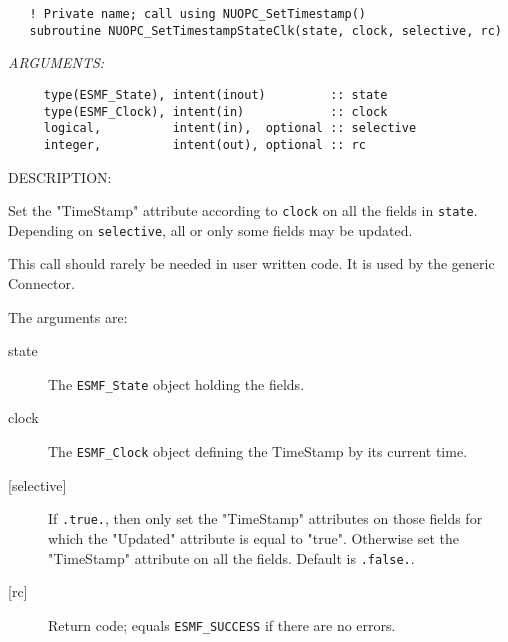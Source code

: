 \begin{verbatim}   ! Private name; call using NUOPC_SetTimestamp()
   subroutine NUOPC_SetTimestampStateClk(state, clock, selective, rc)\end{verbatim}{\em ARGUMENTS:}
\begin{verbatim}     type(ESMF_State), intent(inout)         :: state
     type(ESMF_Clock), intent(in)            :: clock
     logical,          intent(in),  optional :: selective
     integer,          intent(out), optional :: rc\end{verbatim}
{\sf DESCRIPTION:\\ }


     Set the "TimeStamp" attribute according to {\tt clock} on all the fields in
     {\tt state}. Depending on {\tt selective}, all or only some fields may be
     updated.
  
     This call should rarely be needed in user written code. It is used 
     by the generic Connector.
  
     The arguments are:
     \begin{description}
     \item[state]
       The {\tt ESMF\_State} object holding the fields.
     \item[clock]
       The {\tt ESMF\_Clock} object defining the TimeStamp by its current time.
     \item[{[selective]}]
       If {\tt .true.}, then only set the "TimeStamp" attributes on those fields
       for which the "Updated" attribute is equal to "true". Otherwise set the
       "TimeStamp" attribute on all the fields. Default is {\tt .false.}.
     \item[{[rc]}]
       Return code; equals {\tt ESMF\_SUCCESS} if there are no errors.
     \end{description}
  
\setlength{\parskip}{\oldparskip}
\setlength{\parindent}{\oldparindent}
\setlength{\baselineskip}{\oldbaselineskip}
